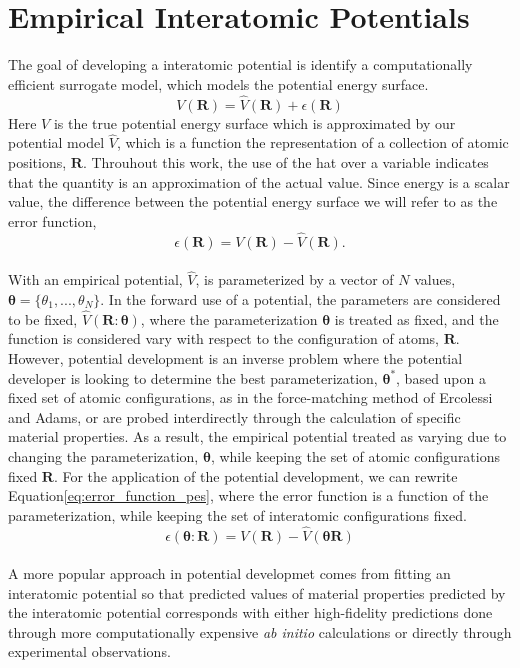 \section{Empirical Interatomic Potentials}
The goal of developing a interatomic potential is identify a computationally efficient surrogate model, which models the potential energy surface.
\begin{equation}\label{eq:pes_approximation}
  V(\bm{R}) = \hat{V}(\bm{R}) + \epsilon(\bm{R})
\end{equation}
Here $V$ is the true potential energy surface which is approximated by our potential model $\hat{V}$, which is a function the representation of a collection of atomic positions, $\bm{R}$.
Throuhout this work, the use of the hat over a variable indicates that the quantity is an approximation of the actual value.
Since energy is a scalar value, the difference between the potential energy surface we will refer to as the error function,
\begin{equation}\label{eq:error_function_pes}
	\epsilon(\bm{R})=V(\bm{R})-\hat{V}(\bm{R}).
\end{equation}
\\
With an empirical potential, $\hat{V}$, is parameterized by a vector of $N$ values,
${\bm{\theta}=\{\theta_1,...,\theta_N\}}$.
In the forward use of a potential, the parameters are considered to be fixed, $\hat{V}(\bm{R}:\bm{\theta})$, where the parameterization $\bm{\theta}$ is treated as fixed, and the function is considered vary with respect to the configuration of atoms, $\bm{R}$.
However, potential development is an inverse problem where the potential developer is looking to determine the best parameterization, $\bm{\theta}^*$, based upon a fixed set of atomic configurations, as in the force-matching method of Ercolessi and Adams\cite{ercolessi1994_fitting_forcematching}, or are probed interdirectly through the calculation of specific material properties.
As a result, the empirical potential treated as varying due to changing the parameterization, $\bm{\theta}$, while keeping the set of atomic configurations fixed $\bm{R}$.  For the application of the potential development, we can rewrite Equation\ref{eq:error_function_pes}, where the error function is a function of the parameterization, while keeping the set of interatomic configurations fixed.
\begin{equation}
	\epsilon(\bm{\theta}:\bm{R})=V(\bm{R})-\hat{V}(\bm{\theta}\bm{R})
\end{equation}
\\
A more popular approach in potential developmet comes from fitting an interatomic potential so that predicted values of material properties predicted by the interatomic potential corresponds with either high-fidelity predictions done through more computationally expensive \emph{ab initio} calculations or directly through experimental observations.

